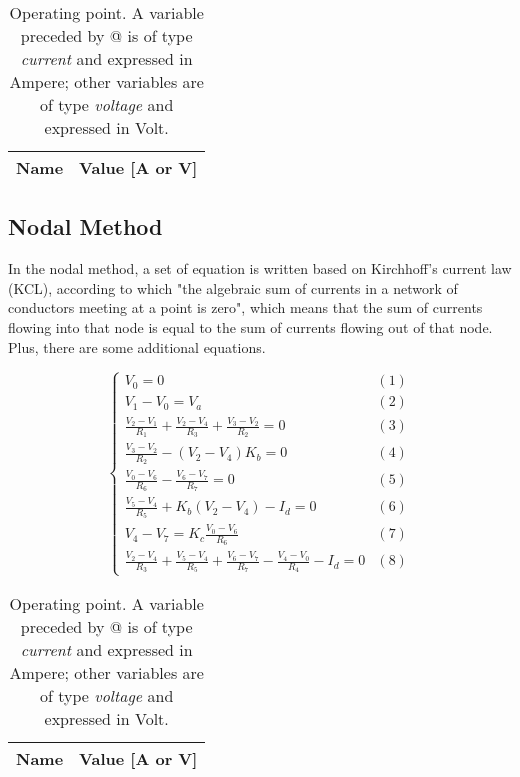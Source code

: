 \begin{table}[h]
  \centering
  \begin{tabular}{|c|c|}
    \hline    
    {\bf Name} & {\bf Value [A or V]} \\ \hline
    
  \end{tabular}
  \caption{Operating point. A variable preceded by @ is of type {\em current}
    and expressed in Ampere; other variables are of type {\it voltage} and expressed in
    Volt.}
  \label{tab:op}
\end{table}


\subsection{Nodal Method}
\par
In the nodal method, a set of equation is written based on Kirchhoff's current law (KCL), according to which "the algebraic sum of currents in a network of conductors meeting at a point is zero", which means that the sum of currents flowing into that node is equal to the sum of currents flowing out of that node. Plus, there are some additional equations.


\begin{equation}
\begin{cases}
V_0 = 0 & \mbox{$(1)$} \\
V_1-V_0 = V_a & \mbox{$(2)$}  \\
\frac{V_2-V_1}{R_1} + \frac{V_2-V_4}{R_3} + \frac{V_3-V_2}{R_2} = 0 & \mbox{$(3)$} \\
\frac{V_3-V_2}{R_2} - (V_2-V_4) K_b = 0 & \mbox{$(4)$} \\
\frac{V_0-V_6}{R_6} - \frac{V_6-V_7}{R_7} = 0 & \mbox{$(5)$}\\
\frac{V_5-V_4}{R_5} + K_b (V_2 - V_4) - I_d = 0 & \mbox{$(6)$}\\
V_4-V_7 = K_c \frac{V_0-V_6}{R_6} & \mbox{$(7)$} \\
\frac{V_2-V_4}{R_3} + \frac{V_5-V_4}{R_5} +  \frac{V_6-V_7}{R_7} - \frac{V_4-V_0}{R_4} - I_d = 0 & \mbox{$(8)$}
\end{cases}
\end{equation}


\begin{table}[h]
  \centering
  \begin{tabular}{|c|c|}
    \hline    
    {\bf Name} & {\bf Value [A or V]} \\ \hline
    
  \end{tabular}
  \caption{Operating point. A variable preceded by @ is of type {\em current}
    and expressed in Ampere; other variables are of type {\it voltage} and expressed in
    Volt.}
  \label{tab:op}
\end{table}

